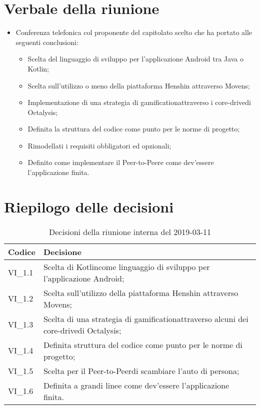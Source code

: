 \section{Verbale della riunione}
\begin{itemize}
	\item Conferenza telefonica col proponente del capitolato scelto che ha portato alle seguenti conclusioni:
	\begin{itemize}
		\item Scelta del linguaggio di sviluppo per l'applicazione Android tra Java o Kotlin\glosp;
		\item Scelta sull'utilizzo o meno della piattaforma Henshin attraverso Movens\glosp;
		\item Implementazione di una strategia di gamification\glosp attraverso i core-drive\glosp di Octalysis\glosp;
		\item Definita la struttura del codice come punto per le norme di progetto;
		\item Rimodellati i requisiti obbligatori ed opzionali;
		\item Definito come implementare il Peer-to-Peer\glosp e come dev'essere l'applicazione finita.   
	\end{itemize}
\end{itemize}
\pagebreak
\section{Riepilogo delle decisioni}

	
	\begin{longtable}{ >{\centering}p{} >{}p{}}
		\caption{Decisioni della riunione interna del 2019-03-11}\\	
		\rowcolorhead
		\textbf{\color{white}Codice} 
		& \centering\textbf{\color{white}Decisione} 
		\tabularnewline 
		\endfirsthead
		VI\_1.1 & Scelta di Kotlin\glosp come linguaggio di sviluppo per l'applicazione Android;
		
		\tabularnewline 
		VI\_1.2 & Scelta sull'utilizzo della piattaforma Henshin attraverso Movens\glosp;
		
		\tabularnewline 
		VI\_1.3 & Scelta di una strategia di gamification\glosp attraverso alcuni dei core-drive\glosp di Octalysis\glosp;
	
		\tabularnewline 
		VI\_1.4 & Definita struttura del codice come punto per le norme di progetto;
		
		\tabularnewline 
		VI\_1.5 & Scelta per il Peer-to-Peer\glosp di scambiare l'auto di persona;
		
		\tabularnewline 
		VI\_1.6 & Definita a grandi linee come dev'essere l'applicazione finita.
	
	\end{longtable}
	




